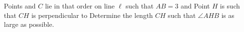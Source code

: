 Points   and $C$ lie in that order on line $\ell$ such that $AB=3$ and   Point $H$ is such that $CH$ is perpendicular to   Determine the length $CH$ such that $\angle AHB$ is as large as possible.